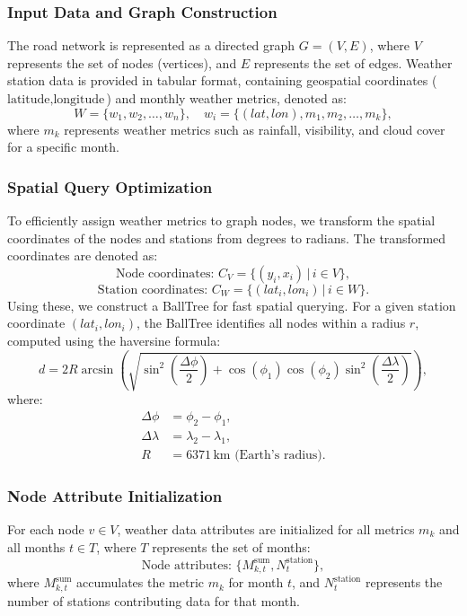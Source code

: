 \documentclass[sigplan,screen]{acmart}
\begin{document}
\subsubsection{Input Data and Graph Construction}
The road network is represented as a directed graph \( G = (V, E) \), where \( V \) represents the set of nodes (vertices), and \( E \) represents the set of edges. Weather station data is provided in tabular format, containing geospatial coordinates (\(\text{latitude}, \text{longitude}\)) and monthly weather metrics, denoted as:
\[
W = \{w_1, w_2, \dots, w_n\}, \quad w_i = \{(lat, lon), m_1, m_2, \dots, m_k\},
\]
where \(m_k\) represents weather metrics such as rainfall, visibility, and cloud cover for a specific month.

\subsubsection{Spatial Query Optimization}
To efficiently assign weather metrics to graph nodes, we transform the spatial coordinates of the nodes and stations from degrees to radians. The transformed coordinates are denoted as:
\[
\text{Node coordinates: } C_V = \{(y_i, x_i) \,|\, i \in V\},
\]
\[
\text{Station coordinates: } C_W = \{(lat_i, lon_i) \,|\, i \in W\}.
\]
Using these, we construct a BallTree for fast spatial querying. For a given station coordinate \( (lat_i, lon_i) \), the BallTree identifies all nodes within a radius \( r \), computed using the haversine formula:
\[
d = 2 R \arcsin \left( \sqrt{\sin^2\left(\frac{\Delta \phi}{2}\right) + \cos(\phi_1)\cos(\phi_2)\sin^2\left(\frac{\Delta \lambda}{2}\right)} \right),
\]
where:
\begin{align*}
\Delta \phi &= \phi_2 - \phi_1, \\
\Delta \lambda &= \lambda_2 - \lambda_1, \\
R &= 6371 \, \text{km (Earth's radius)}.
\end{align*}

\subsubsection{Node Attribute Initialization}
For each node \( v \in V \), weather data attributes are initialized for all metrics \( m_k \) and all months \( t \in T \), where \( T \) represents the set of months:
\[
\text{Node attributes: } \{M_{k,t}^\text{sum}, N_t^\text{station}\},
\]
where \(M_{k,t}^\text{sum}\) accumulates the metric \(m_k\) for month \(t\), and \(N_t^\text{station}\) represents the number of stations contributing data for that month.
\end{document}
